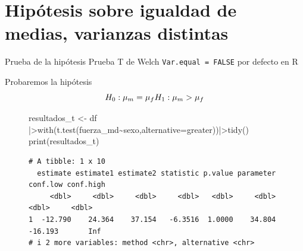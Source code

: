 \documentclass[
  ignorenonframetext,
]{beamer}
\newenvironment{Shaded}{\begin{snugshade}}{\end{snugshade}}
\newcommand{\AttributeTok}[1]{\textcolor[rgb]{0.40,0.45,0.13}{#1}}
\newcommand{\FunctionTok}[1]{\textcolor[rgb]{0.28,0.35,0.67}{#1}}
\newcommand{\NormalTok}[1]{\textcolor[rgb]{0.00,0.23,0.31}{#1}}
\newcommand{\OtherTok}[1]{\textcolor[rgb]{0.00,0.23,0.31}{#1}}
\newcommand{\SpecialCharTok}[1]{\textcolor[rgb]{0.37,0.37,0.37}{#1}}
\newcommand{\StringTok}[1]{\textcolor[rgb]{0.13,0.47,0.30}{#1}}
\begin{document}
\section{Hipótesis sobre igualdad de medias, varianzas
distintas}\label{hipuxf3tesis-sobre-igualdad-de-medias-varianzas-distintas}

\begin{frame}[fragile]{Prueba de la hipótesis}
\label{prueba-de-la-hipuxf3tesis}
Prueba T de Welch \texttt{Var.equal\ =\ FALSE} por defecto en R

Probaremos la hipótesis \[
H_0: \mu_m=\mu_f \\
H_1: \mu_m>\mu_f\]

\begin{figure}

\begin{Shaded}
\begin{Highlighting}[]
\NormalTok{resultados\_t }\OtherTok{\textless{}{-}}\NormalTok{ df }\SpecialCharTok{|\textgreater{}}\FunctionTok{with}\NormalTok{(}\FunctionTok{t.test}\NormalTok{(fuerza\_md}\SpecialCharTok{\textasciitilde{}}\NormalTok{sexo,}\AttributeTok{alternative=}\StringTok{\textquotesingle{}greater\textquotesingle{}}\NormalTok{))}\SpecialCharTok{|\textgreater{}}\FunctionTok{tidy}\NormalTok{()}
\FunctionTok{print}\NormalTok{(resultados\_t)}
\end{Highlighting}
\end{Shaded}

\begin{verbatim}
# A tibble: 1 x 10
  estimate estimate1 estimate2 statistic p.value parameter conf.low conf.high
     <dbl>     <dbl>     <dbl>     <dbl>   <dbl>     <dbl>    <dbl>     <dbl>
1  -12.790    24.364    37.154   -6.3516  1.0000    34.804  -16.193       Inf
# i 2 more variables: method <chr>, alternative <chr>
\end{verbatim}

\end{figure}%
\end{frame}
\end{document}
